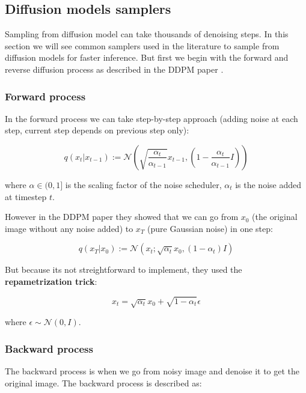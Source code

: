 \subsection{Diffusion models samplers}

Sampling from diffusion model can take thousands of denoising steps. In this section we will see common samplers used in the literature to sample from diffusion models for faster inference. But first we begin with the forward and reverse diffusion process as described in the DDPM paper \cite{ddpm}.








\subsubsection*{Forward process}

In the forward process we can take step-by-step approach (adding noise at each step, current step depends on previous step only):

\[ q(x_t | x_{t-1}) := \mathcal{N} \left( \sqrt{\frac{\alpha_t}{\alpha_{t-1}}} x_{t-1}, \left( 1 - \frac{\alpha_t}{\alpha_{t-1}} I \right) \right) \]

where $\alpha \in (0, 1]$ is the scaling factor of the noise scheduler, $\alpha_t$ is the noise added at timestep $t$.

However in the DDPM paper \cite{ddpm} they showed that we can go from $x_0$ (the original image without any noise added) to $x_T$ (pure Gaussian noise) in one step:

\[ q(x_T | x_0) := \mathcal{N} \left( x_t; \sqrt{\alpha_t} x_0, (1 - \alpha_t) I \right) \]

But because its not streightforward to implement, they used the \textbf{repametrization trick}:

\[ x_t = \sqrt{\alpha_t} x_0 + \sqrt{1 - \alpha_t} \epsilon \]

where $\epsilon \sim \mathcal{N} (0, I)$. 








\subsubsection*{Backward process}

The backward process is when we go from noisy image and denoise it to get the original image. The backward process is described as:

